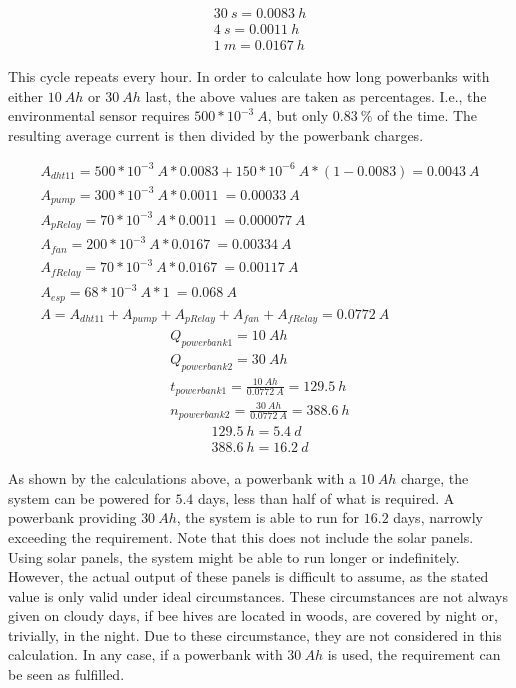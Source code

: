 \begin{align}
    30\ s = 0.0083\ h \\
    4\ s = 0.0011\ h \\
    1\ m = 0.0167\ h
\end{align}

This cycle repeats every hour.
In order to calculate how long powerbanks with either $10\ Ah$ or $30\ Ah$ last, the above values are taken as percentages.
I.e., the environmental sensor requires $500 * 10^{-3}\ A$, but only $0.83\ \%$ of the time.
The resulting average current is then divided by the powerbank charges.

\begin{align}
    A_{dht11} = 500 * 10^{-3}\ A * 0.0083 + 150 * 10^{-6}\ A * (1 - 0.0083) = 0.0043\ A\\
    A_{pump} = 300 * 10^{-3}\ A * 0.0011\  = 0.00033\ A\\
    A_{pRelay} = 70 * 10^{-3}\ A * 0.0011\  = 0.000077\ A\\
    A_{fan} = 200 * 10^{-3}\ A * 0.0167\  = 0.00334\ A\\
    A_{fRelay} = 70 * 10^{-3}\ A * 0.0167\  = 0.00117\ A\\
    A_{esp} = 68*10^{-3}\ A * 1\  = 0.068\ A \\
    A = A_{dht11} + A_{pump} + A_{pRelay} + A_{fan} + A_{fRelay} = 0.0772\ A
\end{align}
\begin{align}
    Q_{powerbank1} = 10\ Ah \\
    Q_{powerbank2} = 30\ Ah \\
    t_{powerbank1} = \frac{10\ Ah}{0.0772\ A} = 129.5\ h \\
    n_{powerbank2} = \frac{30\ Ah}{0.0772\ A} = 388.6\ h
\end{align}
\begin{align}
    129.5\ h = 5.4\ d \\
    388.6\ h = 16.2\ d
\end{align}

As shown by the calculations above, a powerbank with a $10\ Ah$ charge, the system can be powered for $5.4$ days, less than half of what is required.
A powerbank providing $30\ Ah$, the system is able to run for $16.2$ days, narrowly exceeding the requirement.
Note that this does not include the solar panels.
Using solar panels, the system might be able to run longer or indefinitely.
However, the actual output of these panels is difficult to assume, as the stated value is only valid under ideal circumstances.
These circumstances are not always given on cloudy days, if bee hives are located in woods, are covered by night or, trivially, in the night.
Due to these circumstance, they are not considered in this calculation.
In any case, if a powerbank with $30\ Ah$ is used, the requirement can be seen as fulfilled.

